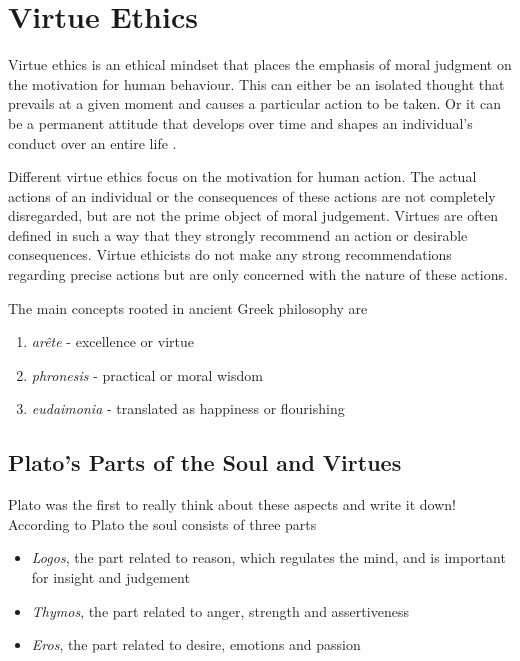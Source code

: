 \documentclass[11pt]{article}
\theoremstyle{definition}
\begin{document}
\section{Virtue Ethics}
Virtue ethics is an ethical mindset that places the emphasis of moral judgment on the motivation for human behaviour. This can either be an isolated thought that prevails at a given moment and causes a particular action to be taken. Or it can be a permanent attitude that develops over time and shapes an individual’s conduct over an entire life \parencite{hubner2018einfuhrung}.

Different virtue ethics focus on the motivation for human action. The actual actions of an individual or the consequences of these actions are not completely disregarded, but are not the prime object of moral judgement. Virtues are often defined in such a way that they strongly recommend an action or desirable consequences. Virtue ethicists do not make any strong recommendations regarding precise actions but are only concerned with the nature of these actions.

The main concepts rooted in ancient Greek philosophy are
\begin{enumerate}
	\item \emph{arête} - excellence or virtue
	\item \emph{phronesis} - practical or moral wisdom
	\item \emph{eudaimonia} - translated as happiness or flourishing
\end{enumerate}

\subsection{Plato's Parts of the Soul and Virtues}
Plato was the first to really think about these aspects and write it down! According to Plato the soul consists of three parts
\begin{itemize}
	\item \textit{Logos}, the part related to reason, which regulates the mind, and is important for insight and judgement
	\item \textit{Thymos}, the part related to anger, strength and assertiveness
	\item \textit{Eros}, the part related to desire, emotions and passion
\end{itemize}
\end{document}
